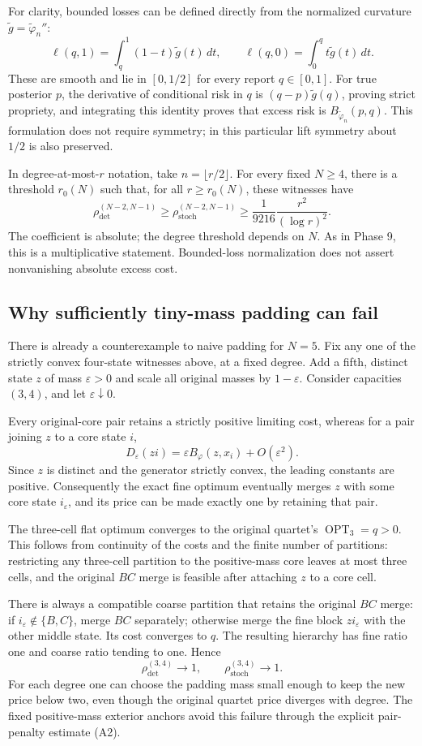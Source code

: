 For clarity, bounded losses can be defined directly from the normalized
curvature $\widetilde g=\widetilde\varphi_n''$:
\[
 \ell(q,1)=\int_q^1(1-t)\widetilde g(t)\,dt,
 \qquad
 \ell(q,0)=\int_0^q t\widetilde g(t)\,dt.
\]
These are smooth and lie in $[0,1/2]$ for every report $q\in[0,1]$.
For true posterior $p$, the derivative of conditional risk in $q$ is
$(q-p)\widetilde g(q)$, proving strict propriety, and integrating this
identity proves that excess risk is $B_{\widetilde\varphi_n}(p,q)$.
This formulation does not require symmetry; in this particular lift
symmetry about $1/2$ is also preserved.

In degree-at-most-$r$ notation, take $n=\lfloor r/2\rfloor$. For every
fixed $N\ge4$, there is a threshold $r_0(N)$ such that, for all
$r\ge r_0(N)$, these witnesses have
\[
 \rho_{\mathrm{det}}^{(N-2,N-1)}
 \ge\rho_{\mathrm{stoch}}^{(N-2,N-1)}
 \ge\frac1{9216}\frac{r^2}{(\log r)^2}.
\]
The coefficient is absolute; the degree threshold depends on $N$.
As in Phase 9, this is a multiplicative statement. Bounded-loss
normalization does not assert nonvanishing absolute excess cost.

\subsection{Why sufficiently tiny-mass padding can fail}
There is already a counterexample to naive padding for $N=5$.
Fix any one of the strictly convex four-state witnesses above, at a
fixed degree. Add a fifth, distinct state $z$ of mass $\varepsilon>0$
and scale all original masses by $1-\varepsilon$. Consider capacities
$(3,4)$, and let $\varepsilon\downarrow0$.

Every original-core pair retains a strictly positive limiting cost,
whereas for a pair joining $z$ to a core state $i$,
\[
 D_\varepsilon(zi)
 =\varepsilon B_\varphi(z,x_i)+O(\varepsilon^2).
\]
Since $z$ is distinct and the generator strictly convex, the leading
constants are positive. Consequently the exact fine optimum eventually
merges $z$ with some core state $i_\varepsilon$, and its price can be
made exactly one by retaining that pair.

The three-cell flat optimum converges to the original quartet's
$\operatorname{OPT}_3=q>0$. This follows from continuity of the costs
and the finite number of partitions: restricting any three-cell partition
to the positive-mass core leaves at most three cells, and the original
$BC$ merge is feasible after attaching $z$ to a core cell.

There is always a compatible coarse partition that retains the original
$BC$ merge: if $i_\varepsilon\notin\{B,C\}$, merge $BC$ separately;
otherwise merge the fine block $zi_\varepsilon$ with the other middle
state. Its cost converges to $q$. The resulting hierarchy has fine ratio
one and coarse ratio tending to one. Hence
\[
 \rho_{\mathrm{det}}^{(3,4)}\longrightarrow1,
 \qquad \rho_{\mathrm{stoch}}^{(3,4)}\longrightarrow1.
\]
For each degree one can choose the padding mass small enough to keep
the new price below two, even though the original quartet price diverges
with degree. The fixed positive-mass exterior anchors avoid this failure
through the explicit pair-penalty estimate (A2).
